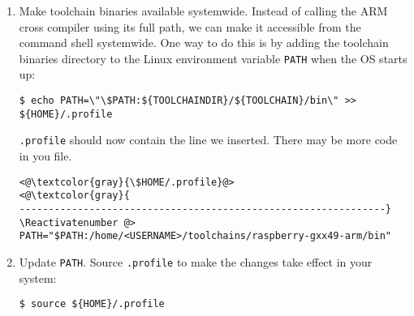 \begin{enumerate}
    

\item Make toolchain binaries available systemwide. Instead of calling
the ARM cross compiler using its full path, we can make it accessible
from the command shell systemwide. One way to do this is by adding the 
toolchain binaries directory to the Linux environment variable \texttt{PATH}
when the \ac{OS} starts up:


\begin{lstlisting}[]
$ echo PATH=\"\$PATH:${TOOLCHAINDIR}/${TOOLCHAIN}/bin\" >> ${HOME}/.profile
\end{lstlisting}
\FloatBarrier
\vspace{-5mm}


\texttt{.profile} should now contain the line we inserted. There may be more
code in you file.
\Suppressnumber\begin{lstlisting}[]
<@\textcolor{gray}{\$HOME/.profile}@>
<@\textcolor{gray}{
---------------------------------------------------------------}
\Reactivatenumber @>
PATH="$PATH:/home/<USERNAME>/toolchains/raspberry-gxx49-arm/bin"
\end{lstlisting}
\FloatBarrier

\item Update \texttt{PATH}. Source \texttt{.profile} to make the changes
take effect in your system:
\begin{lstlisting}[]
$ source ${HOME}/.profile
\end{lstlisting}
\FloatBarrier
\vspace{-5mm}


\end{enumerate}
